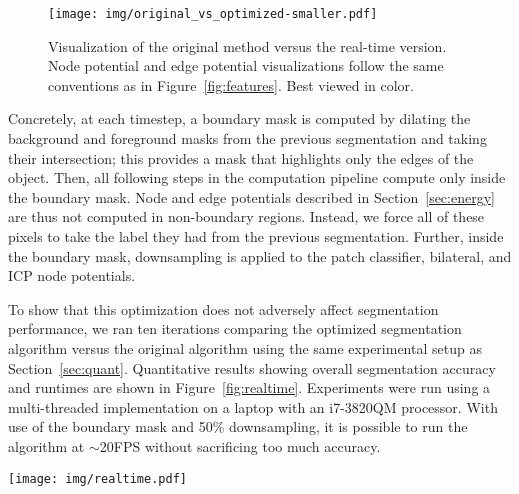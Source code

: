 \documentclass[journal]{IEEEtran}
\newcommand{\todoCR}[1]{}
\begin{document}
\begin{figure}
  \centering
  \texttt{[image: img/original\_vs\_optimized-smaller.pdf]}
  \caption{Visualization of the original method versus the real-time version.  Node potential and edge potential visualizations follow the same conventions as in Figure~\ref{fig:features}.  Best viewed in color.}
  \label{fig:mask}
\end{figure}


Concretely, at each timestep, a boundary mask is computed by dilating the background and foreground masks from the previous segmentation and taking their intersection; this provides a mask that highlights only the edges of the object.  Then, all following steps in the computation pipeline compute only inside the boundary mask.  Node and edge potentials described in Section~\ref{sec:energy} are thus not computed in non-boundary regions.  Instead, we force all of these pixels to take the label they had from the previous segmentation. Further, inside the boundary mask, downsampling is applied to the patch classifier, bilateral, and ICP node potentials.

To show that this optimization does not adversely affect segmentation performance, we ran ten iterations comparing the optimized segmentation algorithm versus the original algorithm using the same experimental setup as Section~\ref{sec:quant}.  Quantitative results showing overall segmentation accuracy and runtimes are shown in Figure~\ref{fig:realtime}. Experiments were run using a multi-threaded implementation on a laptop with an i7-3820QM processor.  With use of the boundary mask and 50\% downsampling, it is possible to run the algorithm at $\sim$20FPS without sacrificing too much accuracy.

\begin{figure*}
  \centering
  \texttt{[image: img/realtime.pdf]}
  \caption{Test set normalized loss and average per-frame segmentation time compared with different levels of algorithmic optimization as discussed in Section~\ref{sec:realtime}.  Thirteen runs of each condition were made; error bars and annotations show one standard deviation for this dataset. While a 75\% downsampling induces too much error to be acceptable, 50\% downsampling appears to be a good trade-off for many applications.  Timing results for the original method differ from those presented in Section~\ref{sec:quant} because multithreading is enabled here. \todoCR{Also, sec:quant should report timing results from Aluminum, not Rg.} \todoCR{Reported stdevs should probably be for everything combined; when people think timing stdev they're going to think that's per-frame, and this plot is reporting per-full-test-run which has much lower stdev.}}
  \label{fig:realtime}
\end{figure*}
\end{document}
